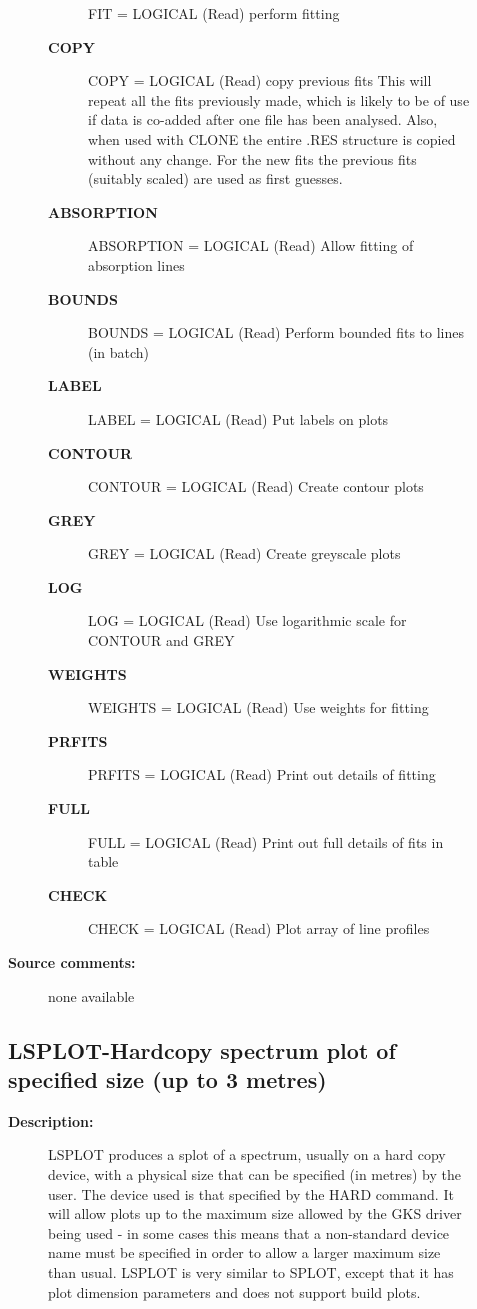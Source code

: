 \begin{description}
\begin{description}
\begin{description}
   FIT = LOGICAL (Read)
        perform fitting
\item [\textbf{COPY}]
   COPY = LOGICAL (Read)
        copy previous fits
        This will repeat all the fits previously made, which
        is likely to be of use if data is co-added after one
        file has been analysed. Also, when used with CLONE
        the entire .RES structure is copied without any change.
        For the new fits the previous fits (suitably scaled)
        are used as first guesses.
\item [\textbf{ABSORPTION}]
   ABSORPTION = LOGICAL (Read)
        Allow fitting of absorption lines
\item [\textbf{BOUNDS}]
   BOUNDS = LOGICAL (Read)
        Perform bounded fits to lines (in batch)
\item [\textbf{LABEL}]
   LABEL = LOGICAL (Read)
        Put labels on plots
\item [\textbf{CONTOUR}]
   CONTOUR = LOGICAL (Read)
        Create contour plots
\item [\textbf{GREY}]
   GREY = LOGICAL (Read)
        Create greyscale plots
\item [\textbf{LOG}]
   LOG = LOGICAL (Read)
        Use logarithmic scale for CONTOUR and GREY
\item [\textbf{WEIGHTS}]
   WEIGHTS = LOGICAL (Read)
        Use weights for fitting
\item [\textbf{PRFITS}]
   PRFITS = LOGICAL (Read)
        Print out details of fitting
\item [\textbf{FULL}]
   FULL = LOGICAL (Read)
        Print out full details of fits in table
\item [\textbf{CHECK}]
   CHECK = LOGICAL (Read)
        Plot array of line profiles
\end{description}

\item [\textbf{Source comments:}]
\begin{terminalv}
  none available

\end{terminalv}
\end{description}
\subsection{LSPLOT-\label{LSPLOT}Hardcopy spectrum plot of specified size (up to 3 metres)}
\begin{description}

\item [\textbf{Description:}]
 LSPLOT produces a splot of a spectrum, usually on a hard copy
 device, with a physical size that can be specified (in metres) by
 the user. The device used is that specified by the HARD command.
 It will allow plots up to the maximum size allowed by the GKS
 driver being used - in some cases this means that a non-standard
 device  name must be specified in order to allow a larger maximum
 size than usual.  LSPLOT is very similar to SPLOT, except that it
 has plot dimension parameters and does not support build plots.


\end{description}
\end{description}
